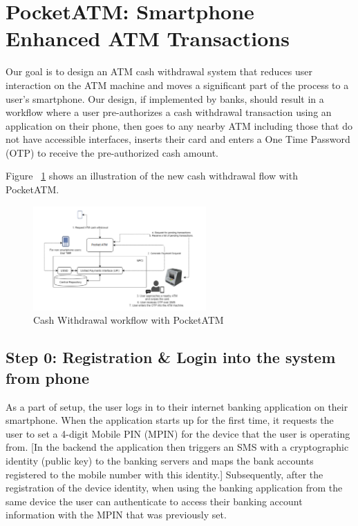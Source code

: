 \section{PocketATM: Smartphone Enhanced ATM Transactions}
\label{sec:pocketatm}

Our goal is to design an ATM cash withdrawal system that reduces user interaction on the ATM machine and moves a significant part of the process to a user's smartphone. Our design, if implemented by banks, should result in a workflow where a user pre-authorizes a cash withdrawal transaction using an application on their phone, then goes to any nearby ATM including those that do not have accessible interfaces, inserts their card and enters a One Time Password (OTP) to receive the pre-authorized cash amount. 

Figure ~\ref{fig:pocketatm_architecture} shows an illustration of the new cash withdrawal flow with PocketATM.

\begin{figure}[h]
    \centering
    \includegraphics[width=250px]{pocketatmarchitecture}
    \caption{Cash Withdrawal workflow with PocketATM}
    \label{fig:pocketatm_architecture}
\end{figure}

\subsection*{Step 0: Registration \& Login into the system from phone}
\label{ssec:step0}

As a part of setup, the user logs in to their internet banking application on their smartphone. When the application starts up for the first time, it requests the user to set a 4-digit Mobile PIN (MPIN) for the device that the user is operating from. [In the backend the application then triggers an SMS with a cryptographic identity (public key) to the banking servers and maps the bank accounts registered to the mobile number with this identity.] Subsequently, after the registration of the device identity, when using the banking application from the same device the user can authenticate to access their banking account information with the MPIN that was previously set.

